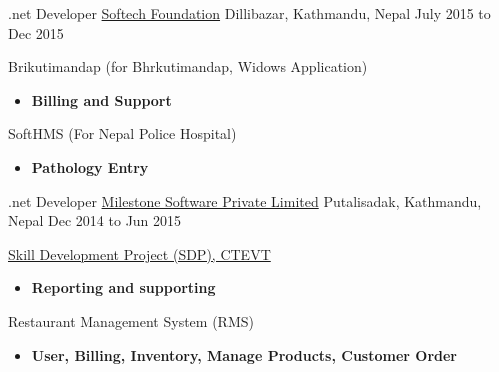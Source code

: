 \begin{cventries}
{\begin{cvitems}
{		\begin{itemize}
			\item {Reporting}
			\item {Security (User, Role management)}
		\end{itemize}
	\end{cvitems}
}
  \cventry
    {.net Developer} %
    {\href{http://softechfoundation.com/}{Softech Foundation}} %
    {Dillibazar, Kathmandu, Nepal} %
    {July 2015 to Dec 2015} %
    {
    	\begin{cvitems} %
    		\item {Brikutimandap (for Bhrkutimandap, Widows Application)}
    		\begin{itemize}
    			\item {\textbf{Billing and Support}}
    		\end{itemize}
    		\item {SoftHMS (For Nepal Police Hospital)}
    		\begin{itemize}
    			\item {\textbf{Pathology Entry}}
    		\end{itemize}
    	\end{cvitems}
    }
 
  \cventry
    {.net Developer} %
    {\href{http://milestonesoftware.com.np/}{Milestone Software Private Limited}} %
    {Putalisadak, Kathmandu, Nepal} %
    {Dec 2014 to Jun 2015} %
    {
      \begin{cvitems} %
        \item {\href{http://202.45.144.216/}{Skill Development Project (SDP), CTEVT}}
        \begin{itemize}
        \item {\textbf{Reporting and supporting}}
        \end{itemize}
        \item {Restaurant Management System (RMS)}
        \begin{itemize}
        \item {\textbf{User, Billing, Inventory, Manage Products, Customer Order}}
        \end{itemize}
      \end{cvitems}
    }


\end{cventries}
